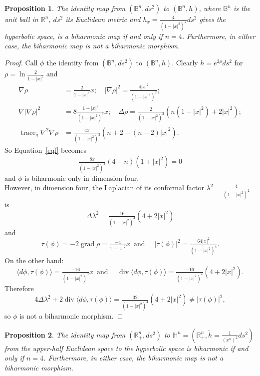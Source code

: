 \documentclass[12pt]{amsart}
\theoremstyle{plain}
\newtheorem{prop}{Proposition}
\theoremstyle{definition}
\begin{document}
\begin{prop}
The identity map from $({{\mathbb B}}^n , ds^2)$ to $({{\mathbb B}}^n , h)$, where ${{\mathbb B}}^n$ is the unit
ball in ${{\mathbb R}}^n$, $ds^2$ its Euclidean metric and $h_{x} = \tfrac{4}{(1 - |x|^2)^2}
ds^2$ gives the hyperbolic space, is a biharmonic map if and only if $n=4$.
Furthermore, in either case, the biharmonic map is not a biharmonic morphism.
\end{prop}

\begin{proof}
Call $\phi$ the identity from $({{\mathbb B}}^n , ds^2)$ to $({{\mathbb B}}^n , h)$. Clearly $h =
e^{2\rho} ds^2$ for $\rho = \ln \tfrac{2}{1 - |x|^2}$ and
\begin{align*}
\nabla \rho &= \tfrac{2}{1 - |x|^2}x ; \quad
|\nabla \rho|^2 = \tfrac{4|x|^2}{(1 - |x|^2)^2} ;\\
\nabla|\nabla \rho|^2 &= 8\tfrac{1 + |x|^2}{(1 - |x|^2)^3}x ; \quad
\Delta \rho = \tfrac{2}{(1 - |x|^2)^2}( n(1 - |x|^2) +2 |x|^2) ;\\
\operatorname{trace}_{g} \nabla^{2} \nabla \rho &= \tfrac{4x}{(1 - |x|^2)^3} (n+2 - (n-2) |x|^2) .
\end{align*}
So Equation~\eqref{eqf} becomes
$$ \tfrac{8x}{(1 - |x|^2)^3} (4-n)(1+ |x|^2) =0 $$
and $\phi$ is biharmonic only in dimension four.\\
However, in dimension four, the Laplacian of its conformal factor $\lambda^2 =
\tfrac{4}{(1 - |x|^2)^2}$ is
$$ \Delta \lambda^2 = \tfrac{16}{(1 - |x|^2)^4} (4 + 2  |x|^2)$$
and
$$\tau(\phi) = -2 \operatorname{grad} \rho = \tfrac{-4}{1 - |x|^2} x \, \mbox{ and } \quad
|\tau(\phi)|^2 = \tfrac{64|x|^2}{(1 - |x|^2)^4}  .$$
On the other hand:
$$ \langle d\phi , \tau(\phi) \rangle = \tfrac{-16}{(1 - |x|^2)^3} x \, \mbox{ and } \quad
\operatorname{div} \langle d\phi , \tau(\phi) \rangle = \tfrac{-16}{(1 - |x|^2)^4} (4 + 2 |x|^2) .$$
Therefore
$$ 4 \Delta \lambda^2 + 2 \operatorname{div} \langle d\phi , \tau(\phi) \rangle =
\tfrac{32}{(1 - |x|^2)^4} (4 + 2 |x|^2) \neq |\tau(\phi)|^2,$$ so $\phi$ is not a
biharmonic morphism.
\end{proof}

\begin{prop}
The identity map from $({{\mathbb R}}^{n}_{+}, ds^2)$ to ${{\mathbb H}}^n = ({{\mathbb R}}^{n}_{+},
\tilde{h}=\tfrac{1}{(x^{n})^2}ds^2)$ from the upper-half Euclidean space to the
hyperbolic space is biharmonic if and only if
$n=4$. Furthermore, in either case, the biharmonic map is not a biharmonic morphism.
\end{prop}
\end{document}
